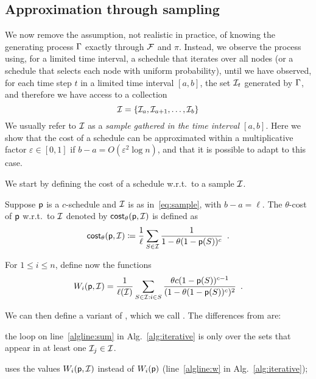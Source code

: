 \subsection{Approximation through sampling}\label{sec:sampcomp}
We now remove the assumption, not realistic in practice, of knowing the
generating process $\Gamma$ exactly through $\mathcal{F}$ and $\pi$. Instead, we
observe the process using, for a limited time interval, a schedule that iterates
over all nodes (or a schedule that selects each node with uniform probability),
until we have observed, for each time step $t$ in a limited time interval
$[a,b]$, the set $\mathcal{I}_t$ generated by $\Gamma$, and therefore we have access
to a collection
\begin{equation}\label{eq:sample}
	\mathcal{I}=\{\mathcal{I}_a,\mathcal{I}_{a+1},\dotsc,\mathcal{I}_b\}
\end{equation}
We usually refer to $\mathcal{I}$ as a \emph{sample gathered in the time interval
$[a,b]$}. Here we show that the cost of a schedule can be approximated within a
multiplicative factor $\varepsilon\in[0,1]$ if $b-a=O(\varepsilon^2\log n)$, and
that it is possible to adapt \algoname to this case.

We start by defining the cost of a schedule w.r.t.~to a sample $\mathcal{I}$.

\begin{definition}\label{def:costsample}
	Suppose $\mathsf{p}$ is a $c$-schedule and $\mathcal{I}$ is as in~\eqref{eq:sample},
	with $b-a=\ell$. The $\theta$-cost of $\mathsf{p}$ w.r.t.~to $\mathcal{I}$
	denoted by $\mathsf{cost}_\theta(\mathsf{p},\mathcal{I})$ is defined as
	\[
		\mathsf{cost}_\theta(\mathsf{p},\mathcal{I})\coloneqq\frac{1}{\ell}\sum_{S\in \mathcal{I}}
		\frac{1}{1-\theta(1-\mathsf{p}(S))^c}\enspace.
	\]
\end{definition}

For $1\le i\le n$, define now the functions
\[
	W_i(\mathsf{p},\mathcal{I}) = \frac{1}{\ell(\mathcal{I})}\sum_{S\in \mathcal{I}: i\in S}
	\frac{\theta c (1-\mathsf{p}(S))^{c-1}}{(1-\theta(1-\mathsf{p}(S))^c)^2}\enspace.
\]

We can then define a variant of \algoname, which we call \algonameapx. The
differences from \algoname are:
\begin{enumerate*}
	\item the loop on line~\ref{algline:sum} in Alg.~\ref{alg:iterative} is only
		over the sets that appear in at least one $\mathcal{I}_j\in\mathcal{I}$.
	\item \algonameapx uses the values $W_i(\mathsf{p},\mathcal{I})$ instead of
		$W_i(\mathsf{p})$ (line~\ref{algline:w} in Alg.~\ref{alg:iterative});
\end{enumerate*}

